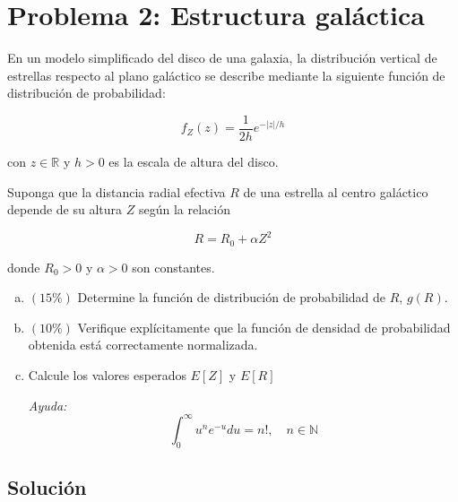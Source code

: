 \documentclass[a4paper]{article}
\begin{document}
\section{Problema 2: Estructura galáctica}
En un modelo simplificado del disco de una galaxia, la distribución vertical de estrellas respecto al plano galáctico se describe mediante la siguiente función de distribución de probabilidad:

$$f_Z(z) = \frac{1}{2h}e^{-|z|/h}$$

con $z\in\mathbb{R}$ y $h>0$ es la escala de altura del disco.

Suponga que la distancia radial efectiva $R$ de una estrella al centro galáctico depende de su altura $Z$ según la relación

$$R=R_0 + \alpha Z^2$$

donde $R_0>0$ y $\alpha >0$ son constantes.

\begin{enumerate}[a.]
	\item $(15\%)$ Determine la función de distribución de probabilidad de $R$, $g(R)$.
	\item $(10\%)$ Verifique explícitamente que la función de densidad de probabilidad obtenida está correctamente normalizada.
	\item Calcule los valores esperados $E[Z]$ y $E[R]$
	
	\textit{Ayuda:} $$\int_{0}^{\infty}u^ne^{-u}du=n!,\quad n\in\mathbb{N}$$
\end{enumerate}

\subsection{Solución}
\end{document}
